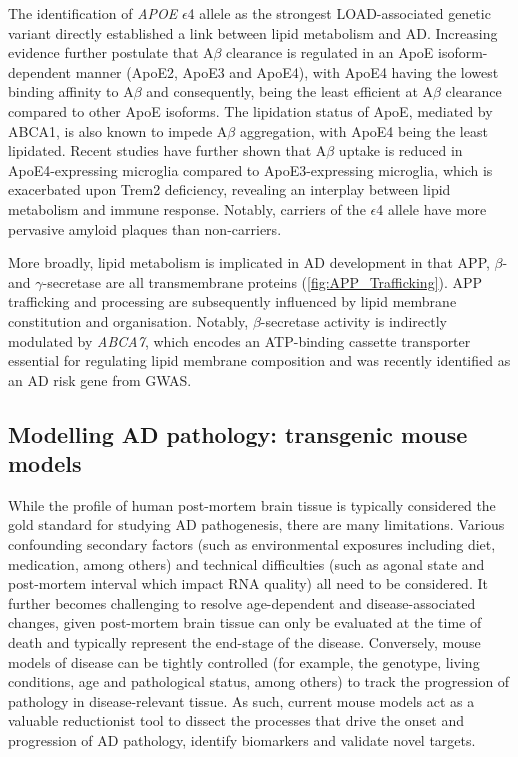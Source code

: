 \label{intro_lipid}
The identification of \textit{APOE} $\epsilon$4 allele as the strongest LOAD-associated genetic variant directly established a link between lipid metabolism and AD. Increasing evidence further postulate that A$\beta$ clearance is regulated in an ApoE isoform-dependent manner (ApoE2, ApoE3 and ApoE4)\cite{Castellano2011}, with ApoE4 having the lowest binding affinity to A$\beta$ and consequently, being the least efficient at A$\beta$ clearance compared to other ApoE isoforms\cite{RM2012}. The lipidation status of ApoE, mediated by ABCA1\cite{R2010}, is also known to impede A$\beta$ aggregation, with ApoE4 being the least lipidated\cite{DM2006}. Recent studies have further shown that A$\beta$ uptake is reduced in ApoE4-expressing microglia compared to ApoE3-expressing microglia, which is exacerbated upon Trem2 deficiency, revealing an interplay between lipid metabolism and immune response\cite{Fitz2021}. Notably, carriers of the $\epsilon$4 allele have more pervasive amyloid plaques than non-carriers\cite{DE1993,E2009}.

More broadly, lipid metabolism is implicated in AD development in that APP, $\beta$- and $\gamma$-secretase are all transmembrane proteins (\cref{fig:APP_Trafficking}). APP trafficking and processing are subsequently influenced by lipid membrane constitution and organisation\cite{DiPaolo2011}. Notably, $\beta$-secretase activity is indirectly modulated by \textit{ABCA7}, which encodes an ATP-binding cassette transporter essential for regulating lipid membrane composition and was recently identified as an AD risk gene from GWAS\cite{Sierksma2020,Sakae2016}.  


\clearpage
\subsection{Modelling AD pathology: transgenic mouse models}
While the profile of human post-mortem brain tissue is typically considered the gold standard for studying AD pathogenesis, there are many limitations. Various confounding secondary factors (such as environmental exposures including diet, medication, among others) and technical difficulties (such as agonal state and post-mortem interval which impact RNA quality) all need to be considered. It further becomes challenging to resolve age-dependent and disease-associated changes, given post-mortem brain tissue can only be evaluated at the time of death and typically represent the end-stage of the disease. Conversely, mouse models of disease can be tightly controlled (for example, the genotype, living conditions, age and pathological status, among others) to track the progression of pathology in disease-relevant tissue. As such, current mouse models act as a valuable reductionist tool to dissect the processes that drive the onset and progression of AD pathology, identify biomarkers and validate novel targets\cite{Hall2012}.

